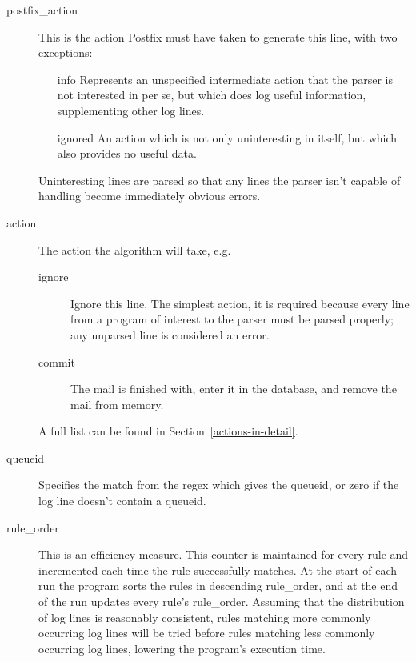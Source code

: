 \documentclass[a4paper,12pt,draft]{article}
\begin{document}
\begin{description}
    \item [postfix\_action] This is the action Postfix must have taken to
        generate this line, with two exceptions:

        \begin{itemize}

            \item [info] Represents an unspecified intermediate action that
                the parser is not interested in per se, but which does log
                useful information, supplementing other log lines.

            \item [ignored] An action which is not only uninteresting in
                itself, but which also provides no useful data.

        \end{itemize}

        Uninteresting lines are parsed so that any lines the parser isn't
        capable of handling become immediately obvious errors.

    \item [action] The action the algorithm will take, e.g.
        \begin{description}

            \item [ignore] Ignore this line.  The simplest action, it is
                required because every line from a program of interest to
                the parser must be parsed properly; any unparsed line is
                considered an error.

            \item [commit] The mail is finished with, enter it in the
                database, and remove the mail from memory.

        \end{description}

        A full list can be found in Section~\ref{actions-in-detail}.

    \item [queueid] Specifies the match from the regex which gives the
        queueid, or zero if the log line doesn't contain a queueid.

    \item [rule\_order] This is an efficiency measure.  This counter is
        maintained for every rule and incremented each time the rule
        successfully matches.  At the start of each run the program sorts
        the rules in descending rule\_order, and at the end of the run
        updates every rule's rule\_order.  Assuming that the distribution
        of log lines is reasonably consistent, rules matching more commonly
        occurring log lines will be tried before rules matching less
        commonly occurring log lines, lowering the program's execution
        time.


\end{description}
\end{document}
